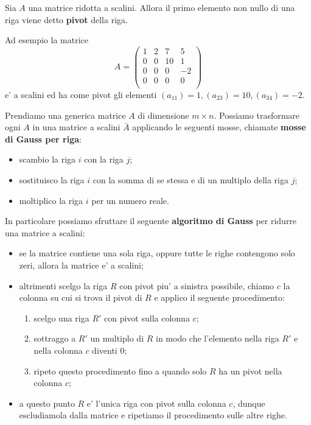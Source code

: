 \begin{definition}
    Sia $A$ una matrice ridotta a scalini. Allora il primo elemento non nullo di una riga viene detto \textbf{pivot} della riga.
\end{definition}

Ad esempio la matrice \[
    A = \begin{pmatrix}
        1   &2  &7  &5\\
        0   &0  &10 &1\\
        0   &0  &0  &-2\\
        0   &0  &0  &0\\
    \end{pmatrix}
\] e' a scalini ed ha come pivot gli elementi $(a_{11}) = 1, (a_{23}) = 10, (a_{34}) = -2$.

Prendiamo una generica matrice $A$ di dimensione $m \times n$. Possiamo trasformare ogni $A$ in una matrice a scalini $\bar{A}$ applicando le seguenti mosse, chiamate \textbf{mosse di Gauss per riga}:
\begin{itemize}
    \item scambio la riga $i$ con la riga $j$;
    \item sostituisco la riga $i$ con la somma di se stessa e di un multiplo della riga $j$;
    \item moltiplico la riga $i$ per un numero reale.
\end{itemize}

In particolare possiamo sfruttare il seguente \textbf{algoritmo di Gauss} per ridurre una matrice a scalini:
\begin{itemize}
    \item se la matrice contiene una sola riga, oppure tutte le righe contengono solo zeri, allora la matrice e' a scalini;
    \item altrimenti scelgo la riga $R$ con pivot piu' a sinistra possibile, chiamo $c$ la colonna su cui si trova il pivot di $R$ e applico il seguente procedimento: \begin{enumerate}
        \item scelgo una riga $R'$ con pivot sulla colonna $c$;
        \item sottraggo a $R'$ un multiplo di $R$ in modo che l'elemento nella riga $R'$ e nella colonna $c$ diventi $0$;
        \item ripeto questo procedimento fino a quando solo $R$ ha un pivot nella colonna $c$; 
    \end{enumerate}
    \item a questo punto $R$ e' l'unica riga con pivot sulla colonna $c$, dunque escludiamola dalla matrice e ripetiamo il procedimento sulle altre righe.
\end{itemize}

